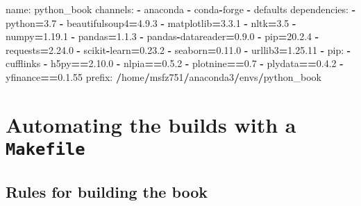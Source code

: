 \documentclass[
]{book}
\newenvironment{Shaded}{\begin{snugshade}}{\end{snugshade}}
\newcommand{\FloatTok}[1]{\textcolor[rgb]{0.06,0.06,0.06}{#1}}
\newcommand{\NormalTok}[1]{#1}
\newcommand{\OperatorTok}[1]{\textcolor[rgb]{0.43,0.43,0.43}{\textbf{#1}}}
\begin{document}
\begin{Shaded}
\begin{Highlighting}[]
\NormalTok{name: python\_book}
\NormalTok{channels:}
  \OperatorTok{{-}}\NormalTok{ anaconda}
  \OperatorTok{{-}}\NormalTok{ conda}\OperatorTok{{-}}\NormalTok{forge}
  \OperatorTok{{-}}\NormalTok{ defaults}
\NormalTok{dependencies:}
  \OperatorTok{{-}}\NormalTok{ python}\OperatorTok{=}\FloatTok{3.7}
  \OperatorTok{{-}}\NormalTok{ beautifulsoup4}\OperatorTok{=}\FloatTok{4.9.3}
  \OperatorTok{{-}}\NormalTok{ matplotlib}\OperatorTok{=}\FloatTok{3.3.1}
  \OperatorTok{{-}}\NormalTok{ nltk}\OperatorTok{=}\FloatTok{3.5}
  \OperatorTok{{-}}\NormalTok{ numpy}\OperatorTok{=}\FloatTok{1.19.1}
  \OperatorTok{{-}}\NormalTok{ pandas}\OperatorTok{=}\FloatTok{1.1.3}
  \OperatorTok{{-}}\NormalTok{ pandas}\OperatorTok{{-}}\NormalTok{datareader}\OperatorTok{=}\FloatTok{0.9.0}
  \OperatorTok{{-}}\NormalTok{ pip}\OperatorTok{=}\FloatTok{20.2.4}
  \OperatorTok{{-}}\NormalTok{ requests}\OperatorTok{=}\FloatTok{2.24.0}
  \OperatorTok{{-}}\NormalTok{ scikit}\OperatorTok{{-}}\NormalTok{learn}\OperatorTok{=}\FloatTok{0.23.2}
  \OperatorTok{{-}}\NormalTok{ seaborn}\OperatorTok{=}\FloatTok{0.11.0}
  \OperatorTok{{-}}\NormalTok{ urllib3}\OperatorTok{=}\FloatTok{1.25.11}
  \OperatorTok{{-}}\NormalTok{ pip:}
    \OperatorTok{{-}}\NormalTok{ cufflinks}
    \OperatorTok{{-}}\NormalTok{ h5py}\OperatorTok{==}\FloatTok{2.10.0}
    \OperatorTok{{-}}\NormalTok{ nlpia}\OperatorTok{==}\FloatTok{0.5.2}
    \OperatorTok{{-}}\NormalTok{ plotnine}\OperatorTok{==}\FloatTok{0.7}
    \OperatorTok{{-}}\NormalTok{ plydata}\OperatorTok{==}\FloatTok{0.4.2}
    \OperatorTok{{-}}\NormalTok{ yfinance}\OperatorTok{==}\FloatTok{0.1.55}
\NormalTok{prefix: }\OperatorTok{/}\NormalTok{home}\OperatorTok{/}\NormalTok{msfz751}\OperatorTok{/}\NormalTok{anaconda3}\OperatorTok{/}\NormalTok{envs}\OperatorTok{/}\NormalTok{python\_book}
\end{Highlighting}
\end{Shaded}

\hypertarget{automating-the-builds-with-a-makefile}{%
\section*{\texorpdfstring{Automating the builds with a \texttt{Makefile}}{Automating the builds with a Makefile}}\label{automating-the-builds-with-a-makefile}}


\hypertarget{rules-for-building-the-book}{%
\subsection*{Rules for building the book}\label{rules-for-building-the-book}}
\end{document}
